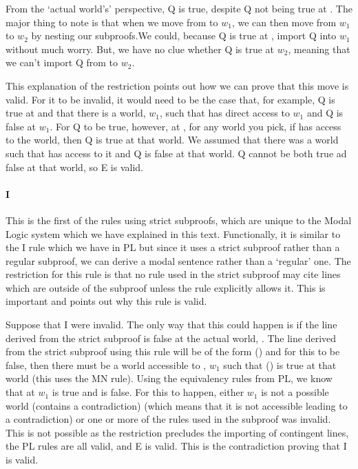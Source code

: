 From the `actual world's' perspective, \ebox Q is true, despite Q not being true at . The major thing to note is that when we move from  to $w_1$, we can then move from $w_1$ to $w_2$ by nesting our subproofs.We could, because \ebox Q is true at , import Q into $w_1$ without much worry. But, we have no clue whether Q is true at $w_2$, meaning that we can't import Q from  to $w_2$. 

This explanation of the restriction points out how we can prove that this move is valid. For it to be invalid, it would need to be the case that, for example, \ebox Q is true at  and that there is a world, $w_1$, such that  has direct access to $w_1$ and Q is false at $w_1$. For \ebox Q to be true, however, at , for any world you pick, if  has access to the world, then Q is true at that world. We assumed that there was a world such that  has access to it and Q is false at that world. Q cannot be both true ad false at that world, so \ebox E is valid. 

\paragraph{\ebox\eif I}
This is the first of the rules using strict subproofs, which are unique to the Modal Logic system which we have explained in this text. Functionally, it is similar to the \eif I rule which we have in PL but since it uses a strict subproof rather than a regular subproof, we can derive a modal sentence rather than a `regular' one. The restriction for this rule is that no rule used in the strict subproof may cite lines which are outside of the subproof unless the rule explicitly allows it. This is important and points out why this rule is valid. 

Suppose that \ebox\eif I were invalid. The only way that this could happen is if the line derived from the strict subproof is false at the actual world, . The line derived from the strict subproof using this rule will be of the form \ebox(\eif{}) and for this to be false, then there must be a world accessible to , $w_1$ such that \enot(\eif{}) is true at that world (this uses the MN rule). Using the equivalency rules from PL, we know that at $w_1$  is true and  is false. For this to happen, either $w_1$ is not a possible world (contains a contradiction) (which means that it is not accessible leading to a contradiction) or one or more of the rules used in the subproof was invalid. This is not possible as the restriction precludes the importing of contingent lines, the PL rules are all valid, and \ebox E is valid. This is the contradiction proving that \ebox\eif I is valid.  

